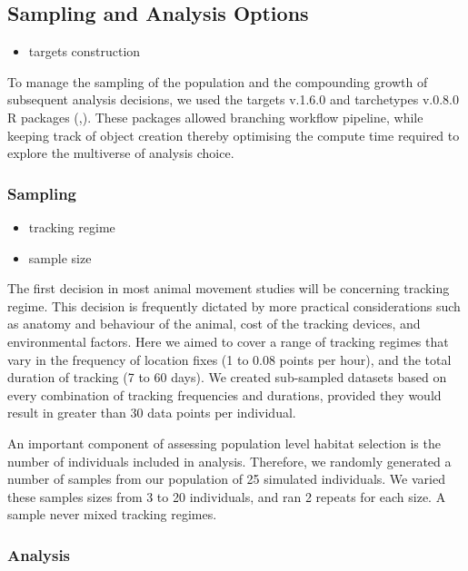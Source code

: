 \documentclass[10pt,a4paper]{article}
\providecommand{\tightlist}{%
  \setlength{\itemsep}{0pt}\setlength{\parskip}{0pt}}
\begin{document}
\subsection{Sampling and Analysis Options}\label{sampling-and-analysis-options}

\begin{itemize}
\tightlist
\item
  targets construction
\end{itemize}

To manage the sampling of the population and the compounding growth of subsequent analysis decisions, we used the targets v.1.6.0 and tarchetypes v.0.8.0 R packages (,).
These packages allowed branching workflow pipeline, while keeping track of object creation thereby optimising the compute time required to explore the multiverse of analysis choice.

\subsubsection{Sampling}\label{sampling}

\begin{itemize}
\item
  tracking regime
\item
  sample size
\end{itemize}

The first decision in most animal movement studies will be concerning tracking regime.
This decision is frequently dictated by more practical considerations such as anatomy and behaviour of the animal, cost of the tracking devices, and environmental factors.
Here we aimed to cover a range of tracking regimes that vary in the frequency of location fixes (1 to 0.08 points per hour), and the total duration of tracking (7 to 60 days).
We created sub-sampled datasets based on every combination of tracking frequencies and durations, provided they would result in greater than 30 data points per individual.

An important component of assessing population level habitat selection is the number of individuals included in analysis.
Therefore, we randomly generated a number of samples from our population of 25 simulated individuals.
We varied these samples sizes from 3 to 20 individuals, and ran 2 repeats for each size.
A sample never mixed tracking regimes.

\subsubsection{Analysis}\label{analysis}
\end{document}
